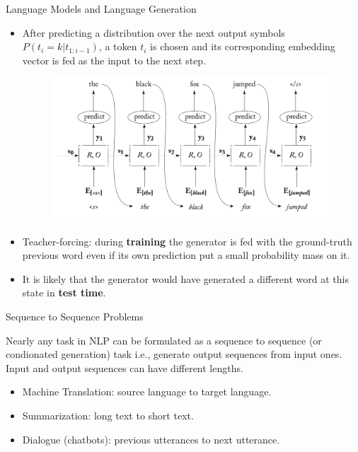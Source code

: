 \documentclass[handout]{beamer}
\begin{document}
\begin{frame}{Language Models and Language Generation}
\begin{scriptsize}
\begin{itemize}
\item After predicting a distribution over the next output symbols $P(t_i = k | t_{1:i-1})$, a token $t_i$ is chosen and its corresponding embedding vector is fed as the input to the next step.
         \begin{figure}[h]
        	\includegraphics[scale = 0.25]{pics/generator.png}
        \end{figure}  
        
\item Teacher-forcing: during \textbf{training} the generator is fed with the ground-truth previous word even if its own prediction put a small probability mass on it. 
\item It is likely that the generator would have generated a different word at this state in \textbf{test time}.        
\end{itemize}
        
        
\end{scriptsize}
\end{frame}




\begin{frame}{Sequence to Sequence Problems}
\begin{scriptsize}
Nearly any task in NLP can be formulated as a sequence to sequence (or condionated generation) task i.e., generate output sequences from input ones. Input and output sequences can have different lengths.
\begin{itemize}
\item Machine Translation: source language to target language.
\item Summarization: long text to short text.
\item Dialogue (chatbots): previous utterances to next utterance.
\end{itemize}
\end{scriptsize}
\end{frame}
\end{document}
